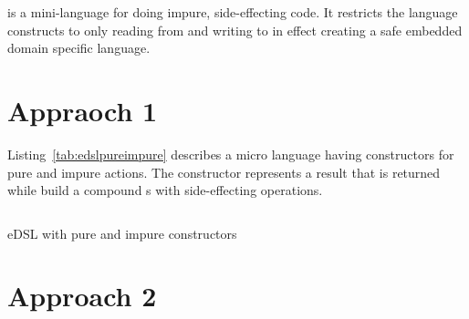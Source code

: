 \documentclass[thesis-solanki.tex]{subfiles}
\begin{document}
 is a mini-language for doing impure, side-effecting code. It restricts the language constructs to only reading 
from  and writing to  in effect creating a safe embedded domain specific language.  

\begin{comment}
\begin{code-list}[H]
\begin{singlespace}
  \inputminted[linenos]{haskell}{haskell-proto4-purvey-wincer.hs}
\end{singlespace}
\caption{\protect\haskellConstruct{IOAction} definitions}
\label{lis:IOAction}
\end{code-list}
\end{comment}




\section{Appraoch 1}

Listing~\ref{tab:edslpureimpure} describes a micro language having constructors for pure and impure actions. The 
constructor represents a result that is returned while  build a compound s
with side-effecting operations.

\begin{code-list}[H]
\begin{singlespace}
  \inputminted[linenos, firstline=12, lastline=21]{haskell}{haskell-proto4-myrtle-uppers.hs}
\end{singlespace}
\caption{eDSL with pure and impure constructors}
\label{tab:edslpureimpure}
\end{code-list}


\section{Approach 2}

\begin{comment}
So when the program is getting interpreted the interpreter encounters an IO operation which then gets "interpreted" to the above and it 
continues normally.

The interpreted program is still pure since the IO actions have not been executed 

if the running is done inside a monad then the IO still is pure.
\end{comment}
\end{document}
